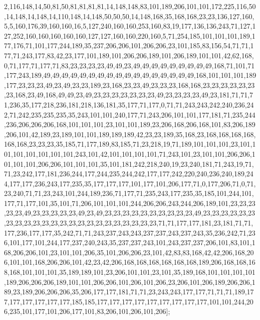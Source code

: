 2,116,148,14,50,81,50,81,81,81,81,14,148,148,83,101,189,206,101,101,172,225,116,50,14,148,14,148,14,110,148,14,148,50,50,50,14,148,168,35,168,168,23,23,136,127,160,5,5,160,176,39,160,160,16,5,127,240,160,160,253,160,83,19,177,136,136,243,71,127,127,252,160,160,160,160,160,127,127,160,160,220,160,5,71,254,185,101,101,101,189,177,176,71,101,177,244,189,35,237,206,206,101,206,206,23,101,185,83,156,54,71,71,177,71,243,177,83,42,23,177,101,189,101,206,206,189,101,206,189,101,101,42,62,168,0,71,177,71,177,71,83,23,23,23,23,49,49,23,49,49,49,49,49,49,49,49,49,168,71,101,71,177,243,189,49,49,49,49,49,49,49,49,49,49,49,49,49,49,49,49,49,168,101,101,101,189,177,23,23,23,49,23,49,23,23,189,23,168,23,23,49,23,23,23,168,168,23,23,23,23,23,23,23,168,23,49,168,49,49,23,49,23,23,23,23,23,23,23,49,23,23,23,23,49,23,181,71,71,71,236,35,177,218,236,181,218,136,181,35,177,71,177,0,71,71,243,243,242,240,236,242,71,242,235,235,235,35,243,101,101,240,177,71,243,206,101,101,177,181,71,235,244,236,206,206,206,168,101,101,101,23,101,101,189,23,206,168,206,168,101,83,206,189,206,101,42,189,23,189,101,101,189,189,189,42,23,23,189,35,168,23,168,168,168,168,168,168,23,23,23,35,185,71,177,189,83,185,71,23,218,19,71,189,101,101,101,23,101,101,101,101,101,101,101,243,101,42,101,101,101,101,71,243,101,23,101,101,206,206,101,101,101,206,206,101,101,101,35,101,181,242,218,240,19,23,240,181,71,243,19,71,71,23,242,177,181,236,244,177,244,235,244,242,177,177,242,220,240,236,240,189,244,177,177,236,243,177,235,35,177,177,177,101,177,101,206,177,71,0,177,206,71,0,71,23,240,71,71,23,243,101,244,189,236,71,177,71,235,243,177,235,35,185,101,244,101,177,71,177,101,35,101,71,206,101,101,101,244,206,206,243,244,206,189,101,23,23,23,23,23,49,23,23,23,23,23,49,23,49,23,23,23,23,23,23,23,23,23,23,49,23,23,23,23,23,23,23,23,23,23,23,23,23,23,23,23,23,23,23,23,23,23,23,71,71,177,177,181,23,181,71,71,177,236,177,177,35,242,71,71,243,237,243,243,237,237,243,237,243,35,236,242,71,236,101,177,101,244,177,237,240,243,35,237,237,243,101,243,237,237,206,101,83,101,168,206,206,101,23,101,101,206,35,101,206,206,23,101,42,83,83,168,42,42,206,168,206,101,101,168,206,206,101,42,23,42,206,168,168,168,168,168,168,189,206,168,168,168,168,101,101,101,35,189,189,101,23,206,101,101,23,101,35,189,168,101,101,101,101,189,206,206,206,189,101,101,206,206,101,206,101,206,23,206,101,206,189,206,206,189,23,189,206,206,206,35,206,177,177,181,71,71,23,243,243,177,177,71,71,71,189,177,177,177,177,177,177,185,185,177,177,177,177,177,177,177,177,177,101,101,244,206,235,101,177,101,206,177,101,83,206,101,206,101,206];

